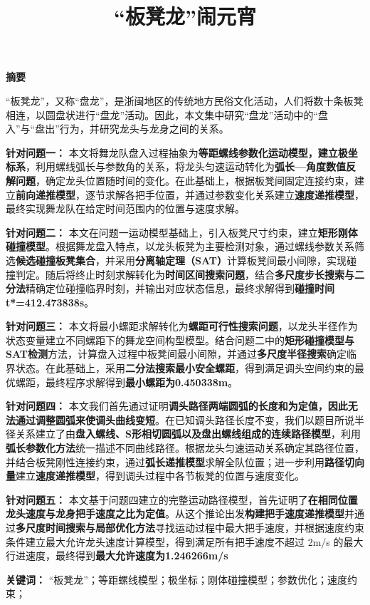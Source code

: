 \documentclass[UTF-8,a4paper,zihao=-4]{ctexart}
\makeatletter
\renewcommand{\maketitle}{
    \begin{center}
        \vspace*{-2cm}
        {\zihao{2}\heiti\@title\par}
    \end{center}
}
\renewenvironment{abstract}
{
    \begin{center}
        {\zihao{-3}\textbf{摘要}}
    \end{center}
    \zihao{-4}
}
{}
\makeatother
\begin{document}
\title{“板凳龙”闹元宵}
\date{}
\maketitle


\begin{abstract}

“板凳龙”，又称“盘龙”，是浙闽地区的传统地方民俗文化活动，人们将数十条板凳相连，以圆盘状进行“盘龙”活动。因此，本文集中研究“盘龙”活动中的“盘入”与“盘出”行为，并研究龙头与龙身之间的关系。
    
\textbf{针对问题一：} 本文将舞龙队盘入过程抽象为\textbf{等距螺线参数化运动模型，建立极坐标系}，利用螺线弧长与参数角的关系，将龙头匀速运动转化为\textbf{弧长—角度数值反解问题}，确定龙头位置随时间的变化。在此基础上，根据板凳间固定连接约束，建立\textbf{前向递推模型}，逐节求解各把手位置，并通过参数变化关系建立\textbf{速度递推模型}，最终实现舞龙队在给定时间范围内的位置与速度求解。
    
\textbf{针对问题二：} 本文在问题一运动模型基础上，引入板凳尺寸约束，建立\textbf{矩形刚体碰撞模型}。根据舞龙盘入特点，以龙头板凳为主要检测对象，通过螺线参数关系筛选\textbf{候选碰撞板凳集合}，并采用\textbf{分离轴定理（SAT）}计算板凳间最小间隙，实现碰撞判定。随后将终止时刻求解转化为\textbf{时间区间搜索问题}，结合\textbf{多尺度步长搜索与二分法}精确定位碰撞临界时刻，并输出对应状态信息，最终求解得到\textbf{碰撞时间t*=412.473838s}。
    
\textbf{针对问题三：} 本文将最小螺距求解转化为\textbf{螺距可行性搜索问题}，以龙头半径作为状态变量建立不同螺距下的舞龙空间构型模型。结合问题二中的\textbf{矩形碰撞模型与SAT检测}方法，计算盘入过程中板凳间最小间隙，并通过\textbf{多尺度半径搜索}确定临界状态。在此基础上，采用\textbf{二分法搜索最小安全螺距}，得到满足调头空间约束的最优螺距，最终程序求解得到\textbf{最小螺距为0.450338m}。

\textbf{针对问题四：} 本文我们首先通过证明\textbf{调头路径两端圆弧的长度和为定值，因此无法通过调整圆弧来使调头曲线变短}。在已知调头路径长度不变，我们以题目所说半径关系建立了由\textbf{盘入螺线、S形相切圆弧以及盘出螺线组成的连续路径模型}，利用\textbf{弧长参数化方法}统一描述不同曲线路径。根据龙头匀速运动关系确定其路径位置，并结合板凳刚性连接约束，通过\textbf{弧长递推模型}求解全队位置；进一步利用\textbf{路径切向量}建立\textbf{速度递推模型}，得到调头过程中各节板凳的位置与速度变化。
    
\textbf{针对问题五：} 本文基于问题四建立的完整运动路径模型，首先证明了\textbf{在相同位置龙头速度与龙身把手速度之比为定值}。从这个推论出发\textbf{构建把手速度递推模型}并通过\textbf{多尺度时间搜索与局部优化方法}寻找运动过程中最大把手速度，并根据速度约束条件建立最大允许龙头速度计算模型，得到满足所有把手速度不超过 2m/s 的最大行进速度，最终得到\textbf{最大允许速度为1.246266m/s}

\noindent \textbf{关键词：} “板凳龙”；等距螺线模型；极坐标；刚体碰撞模型；参数优化；速度约束；
\end{abstract}
\end{document}
